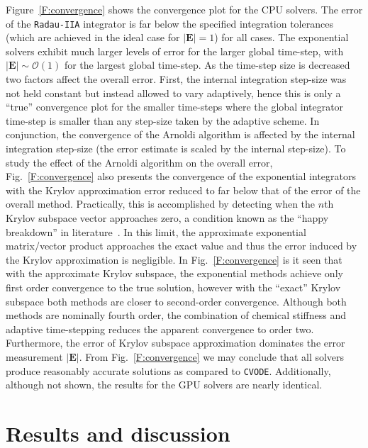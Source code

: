 \documentclass[final,twocolumn]{elsarticle}
\begin{document}
Figure~\ref{F:convergence} shows the convergence plot for the CPU solvers.
The error of the \texttt{Radau-IIA} integrator is far below the specified integration tolerances (which are achieved in the ideal case for $\left\lvert\textbf{E}\right\rvert = 1$) for all cases.
The exponential solvers exhibit much larger levels of error for the larger global time-step, with $\left\lvert\textbf{E}\right\rvert \sim \mathcal{O}(1)$ for the largest global time-step.
As the time-step size is decreased two factors affect the overall error.
First, the internal integration step-size was not held constant but instead allowed to vary adaptively, hence this is only a ``true'' convergence plot for the smaller time-steps where the global integrator time-step is smaller than any step-size taken by the adaptive scheme.
In conjunction, the convergence of the Arnoldi algorithm is affected by the internal integration step-size (the error estimate is scaled by the internal step-size).
To study the effect of the Arnoldi algorithm on the overall error, Fig.~\ref{F:convergence} also presents the convergence of the exponential integrators with the Krylov approximation error reduced to far below that of the error of the overall method.
Practically, this is accomplished by detecting when the $n$th Krylov subspace vector approaches zero, a condition known as the ``happy breakdown'' in literature~\cite{datta2010numerical}.
In this limit, the approximate exponential matrix\slash vector product approaches the exact value and thus the error induced by the Krylov approximation is negligible.
In Fig.~\ref{F:convergence} is it seen that with the approximate Krylov subspace, the exponential methods achieve only first order convergence to the true solution, however with the ``exact'' Krylov subspace both methods are closer to second-order convergence.
Although both methods are nominally fourth order, the combination of chemical stiffness and adaptive time-stepping reduces the apparent convergence to order two.
Furthermore, the error of Krylov subspace approximation dominates the error measurement $\lvert\textbf{E}\rvert$.
From Fig.~\ref{F:convergence} we may conclude that all solvers produce reasonably accurate solutions as compared to \texttt{CVODE}.
Additionally, although not shown, the results for the GPU solvers are nearly identical.


\section{Results and discussion}
\label{S:results}
\ifmeasure
\addvspace{10pt}
\fi
\end{document}
